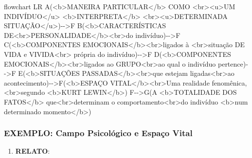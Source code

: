 \documentclass[
]{book}
\newenvironment{Shaded}{\begin{snugshade}}{\end{snugshade}}
\newcommand{\NormalTok}[1]{#1}
\providecommand{\tightlist}{%
  \setlength{\itemsep}{0pt}\setlength{\parskip}{0pt}}
\begin{document}
\begin{Shaded}
\begin{Highlighting}[]
\NormalTok{flowchart LR}
\NormalTok{A(\textless{}b\textgreater{}MANEIRA PARTICULAR\textless{}/b\textgreater{} COMO \textless{}br\textgreater{}\textless{}u\textgreater{}UM INDIVÍDUO\textless{}/u\textgreater{} \textless{}b\textgreater{}INTERPRETA\textless{}/b\textgreater{} \textless{}br\textgreater{}\textless{}u\textgreater{}DETERMINADA SITUAÇÃO\textless{}/u\textgreater{}){-}{-}\textgreater{}F}
\NormalTok{B(\textless{}b\textgreater{}CARACTERÍSTICAS DE\textless{}br\textgreater{}PERSONALIDADE\textless{}/b\textgreater{}\textless{}br\textgreater{}do indivíduo){-}{-}\textgreater{}F}
\NormalTok{C(\textless{}b\textgreater{}COMPONENTES EMOCIONAIS\textless{}/b\textgreater{}\textless{}br\textgreater{}ligados à \textless{}br\textgreater{}situação DE VIDA e VIVIDA\textless{}br\textgreater{} própria do indivíduo){-}{-}\textgreater{}F}
\NormalTok{D(\textless{}b\textgreater{}COMPONENTES EMOCIONAIS\textless{}/b\textgreater{}\textless{}br\textgreater{}ligados ao GRUPO\textless{}br\textgreater{}ao qual o indivíduo pertence){-}{-}\textgreater{}F}
\NormalTok{E(\textless{}b\textgreater{}SITUAÇÕES PASSADAS\textless{}/b\textgreater{}\textless{}br\textgreater{}que estejam ligadas\textless{}br\textgreater{}ao acontecimento){-}{-}\textgreater{}F(\textless{}b\textgreater{}ESPAÇO VITAL\textless{}/b\textgreater{}\textless{}br\textgreater{}\textquotesingle{}\textquotesingle{}Uma realidade fenomênica\textquotesingle{}\textquotesingle{},\textless{}br\textgreater{}segundo \textless{}b\textgreater{}KURT LEWIN\textless{}/b\textgreater{})}
\NormalTok{F{-}{-}\textgreater{}G(A \textless{}b\textgreater{}TOTALIDADE DOS FATOS\textless{}/b\textgreater{} que\textless{}br\textgreater{}determinam o comportamento\textless{}br\textgreater{}do indivíduo \textless{}b\textgreater{}num determinado momento\textless{}/b\textgreater{})}
\end{Highlighting}
\end{Shaded}

\hypertarget{exemplo-campo-psicoluxf3gico-e-espauxe7o-vital}{%
\subsubsection{EXEMPLO: Campo Psicológico e Espaço Vital}\label{exemplo-campo-psicoluxf3gico-e-espauxe7o-vital}}

\begin{enumerate}
\def\labelenumi{\arabic{enumi}.}
\tightlist
\item
  \textbf{RELATO}:
\end{enumerate}
\end{document}

